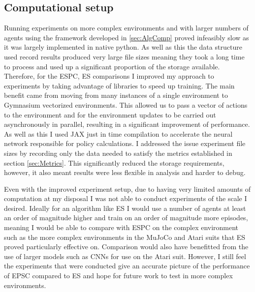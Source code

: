 \subsection{Computational setup}
Running experiments on more complex environments and with larger numbers of agents using the framework developed in \ref{sec:AlgComp} proved infeasibly slow as it was largely implemented in native python. As well as this the data structure used record results produced very large file sizes meaning they took a long time to process and used up a significant proportion of the storage available. Therefore, for the ESPC, ES comparisons I improved my approach to experiments by taking advantage of libraries to speed up training. The main benefit came from moving from many instances of a single environment to Gymnasium vectorized environments. This allowed us to pass a vector of actions to the environment and for the environment updates to be carried out asynchronously in parallel, resulting in a significant improvement of performance. As well as this I used JAX \cite{JAX} just in time compilation to accelerate the neural network responsible for policy calculations. I addressed the issue experiment file sizes by recording only the data needed to satisfy the metrics established in section \ref{sec:Metrics}. This significantly reduced the storage requirements, however, it also meant results were less flexible in analysis and harder to debug.

Even with the improved experiment setup, due to having very limited amounts of computation at my disposal I was not able to conduct experiments of the scale I desired. Ideally for an algorithm like ES I would use a number of agents at least an order of magnitude higher and train on an order of magnitude more episodes, meaning I would be able to compare with ESPC on the complex environment such as the more complex environments in the MuJoCo \cite{MuJoCo} and Atari \cite{Atari} suits that ES proved particularly effective on. Comparison would also have benefitted from the use of larger models such as CNNs for use on the Atari suit. However, I still feel the experiments that were conducted give an accurate picture of the performance of EPSC compared to ES and hope for future work to test in more complex environments.

